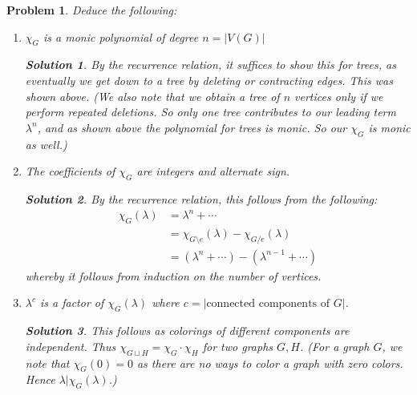 \documentclass{article}
\theoremstyle{normal}
\newtheorem{problem}{Problem}
\theoremstyle{thmit}
\newtheorem*{solution}{Solution}
\begin{document}
    \begin{problem}
        Deduce the following:
            \begin{enumerate}
                \item $\chi_G$ is a monic  polynomial of degree $n=\vert V(G)\vert$
                    \begin{solution}
                        By the recurrence relation, it suffices to show this for trees, as eventually we
                        get down to a tree by deleting or contracting edges. This was shown above. (We also note that we obtain a tree of $n$ vertices only if we perform repeated deletions. So only one tree contributes to our leading term $\lambda^n$, and as shown above the polynomial for trees is monic. So our $\chi_G$ is monic as well.)
                    \end{solution}
                \item The coefficients of $\chi_G$ are integers and alternate sign.
                    \begin{solution}
                        By the recurrence relation, this follows from the following:
                        \begin{subequations}
                            \begin{align}
                                \chi_G(\lambda)&= \lambda^n +\cdots\\
                                    &=\chi_{G\setminus{e}}(\lambda)-\chi_{G/e}(\lambda)\\
                                    &=\left(\lambda^n+\cdots\right)-\left(
                                        \lambda^{n-1}+\cdots\right)    
                            \end{align}
                        \end{subequations}
                        whereby it follows from induction on the number of vertices.
                    \end{solution}
                \item
                    $\lambda^c$ is a factor of $\chi_G(\lambda)$ where
                    $c=\vert \text{connected components of } G\vert$.
                    \begin{solution}
                        This follows as colorings of different components are independent. Thus
                        $\chi_{G\sqcup H} = \chi_G \cdot \chi_H$ for two graphs $G,H$. (For a graph $G$, we note that $\chi_G(0)=0$ as there are no ways to color a graph with zero colors. Hence $\lambda\vert \chi_G (\lambda)$.)
                    \end{solution}
            \end{enumerate}
    \end{problem}
\end{document}
